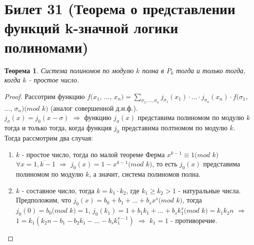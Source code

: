 \documentclass[a4paper, 12pt]{article}
\theoremstyle{definition}
\theoremstyle{plain}
\newtheorem*{theorem}{Теорема}
\theoremstyle{remark}
\begin{document}
  \section{Билет 31 (Теорема о представлении функций k-значной логики полиномами)}
  \begin{theorem}
    Система полиномов по модулю $k$ полна в $P_k$ тогда и только тогда, когда $k$ - простое число.
  \end{theorem}
  \begin{proof}
    Рассотрим функцию $f(x_1$, $\ldots$, $x_n)=\sum\limits_{\sigma_1,\ldots,\sigma_n}j_{\sigma_1}(x_1)\cdot\ldots\cdot j_{\sigma_n}(x_n)\cdot f(\sigma_1$, $\ldots$, $\sigma_n)(mod$ $k)$ (аналог совершенной д.н.ф.).\\
    $j_{\sigma}(x)=j_0(x-\sigma)$ $\Longrightarrow$ функцию $j_{\sigma}(x)$ представима полиномом по модулю $k$ тогда и только тогда, когда функция $j_0$ представима полтномом по модулю $k$. Тогда рассмотрим два случая:
    \begin{enumerate}
      \item $k$ - простое число, тогда по малой теореме Ферма $x^{k-1}\equiv1(mod$ $k)$ $\forall x=\overline{1,k-1}$ $\Longrightarrow$ $j_0(x)=1-x^{k-1}(mod$ $k)$, то есть $j_0(x)$ представима полиномом по модулю $k$, а значит, система полиномов полна.
      \item $k$ - составное число, тогда $k=k_1\cdot k_2$, где $k_1\geqslant k_2>1$ - натуральные числа. Предположим, что $j_0(x)=b_0+b_1+\ldots+b_sx^s(mod$ $k)$, тогда $j_0(0)=b_0(mod$ $k)=1$, $j_0(k_1)=1+b_1k_1+\ldots+b_sk_1^s(mod$ $k)=k_1k_2n$ $\Longrightarrow$ $1=k_1(k_2n-b_1-b_2k_1-\ldots-b_sk_1^{s-1})$ $\Longrightarrow$ $k_1=1$ - противоречие.
    \end{enumerate}
  \end{proof}
\end{document}

